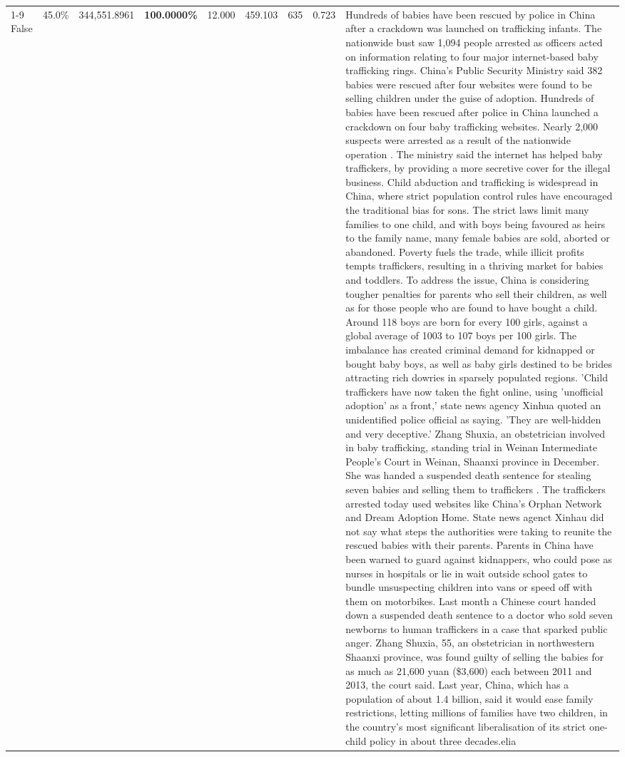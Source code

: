 \begin{table}[H]
\begin{tabular}{lllrlllll}
\cline{1-9}
False & 45.0\% & 344,551.8961 & \bfseries \color{red} 100.0000\% & 12.000 & 459.103 & 635 & 0.723 & Hundreds of babies have been rescued by police in China after a crackdown was launched on trafficking infants. The nationwide bust saw 1,094 people arrested as officers acted on information relating to four major internet-based baby trafficking rings. China's Public Security Ministry said 382 babies were rescued after four websites were found to be selling children under the guise of adoption. Hundreds of babies have been rescued after police in China launched a crackdown on four baby trafficking websites. Nearly 2,000 suspects were arrested as a result of the nationwide operation . The ministry said the internet has helped baby traffickers, by providing a more secretive cover for the illegal business. Child abduction and trafficking is widespread in China, where strict population control rules have encouraged the traditional bias for sons. The strict laws limit many families to one child, and with boys being favoured as heirs to the family name, many female babies are sold, aborted or abandoned. Poverty fuels the trade, while illicit profits tempts traffickers, resulting in a thriving market for babies and toddlers. To address the issue, China is considering tougher penalties for parents who sell their children, as well as for those people who are found to have bought a child. Around 118 boys are born for every 100 girls, against a global average of 1003 to 107 boys per 100 girls. The imbalance has created criminal demand for kidnapped or bought baby boys, as well as baby girls destined to be brides attracting rich dowries in sparsely populated regions. 'Child traffickers have now taken the fight online, using 'unofficial adoption' as a front,' state news agency Xinhua quoted an unidentified police official as saying. 'They are well-hidden and very deceptive.' Zhang Shuxia, an obstetrician involved in baby trafficking, standing trial in Weinan Intermediate People's Court in Weinan, Shaanxi province in December. She was handed a suspended death sentence for stealing seven babies and selling them to traffickers . The traffickers arrested today used websites like China's Orphan Network and Dream Adoption Home. State news agenct Xinhau did not say what steps the authorities were taking to reunite the rescued babies with their parents. Parents in China have been warned to guard against kidnappers, who could pose as nurses in hospitals or lie in wait outside school gates to bundle unsuspecting children into vans or speed off with them on motorbikes. Last month a Chinese court handed down a suspended death sentence to a doctor who sold seven newborns to human traffickers in a case that sparked public anger. Zhang Shuxia, 55, an obstetrician in northwestern Shaanxi province, was found guilty of selling the babies for as much as 21,600 yuan (\$3,600) each between 2011 and 2013, the court said. Last year, China, which has a population of about 1.4 billion, said it would ease family restrictions, letting millions of families have two children, in the country's most significant liberalisation of its strict one-child policy in about three decades.elia \\

\end{tabular}
\end{table}
